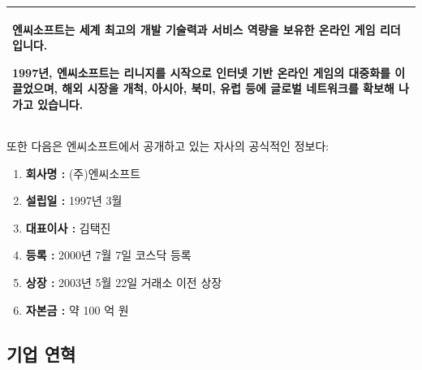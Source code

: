 \documentclass[11pt]{oblivoir}
\newenvironment{textbox}
	{
	\begin{center}
		\begin{tabular}{|p{0.95\textwidth}|}
			\hline
	}
	{
		\\ \hline
		\end{tabular}
		\end{center}
	}
\begin{document}
		\begin{textbox}
			엔씨소프트는 세계 최고의 개발 기술력과 서비스 역량을 보유한 온라인 게임 리더입니다.
			
			1997년, 엔씨소프트는 리니지를 시작으로 인터넷 기반 온라인 게임의 대중화를 이끌었으며, 해외 시장을 개척, 아시아, 북미, 유럽 등에 글로벌 네트워크를 확보해 나가고 있습니다.
		\end{textbox} 
		\pagebreak
		
		\noindent 또한 다음은 엔씨소프트에서 공개하고 있는 자사의 공식적인 정보다:
		\begin{enumerate}
			\item \textbf{회사명 :} (주)엔씨소프트
			\item \textbf{설립일 :} 1997년 3월
  			\item \textbf{대표이사 :} 김택진
			\item \textbf{등록 :} 2000년 7월 7일 코스닥 등록 
			\item \textbf{상장 :} 2003년 5월 22일 거래소 이전 상장
			\item \textbf{자본금 :} 약 100 억 원
		\end{enumerate}
		
		\subsection{기업 연혁}
			\noindent
			
\end{document}
